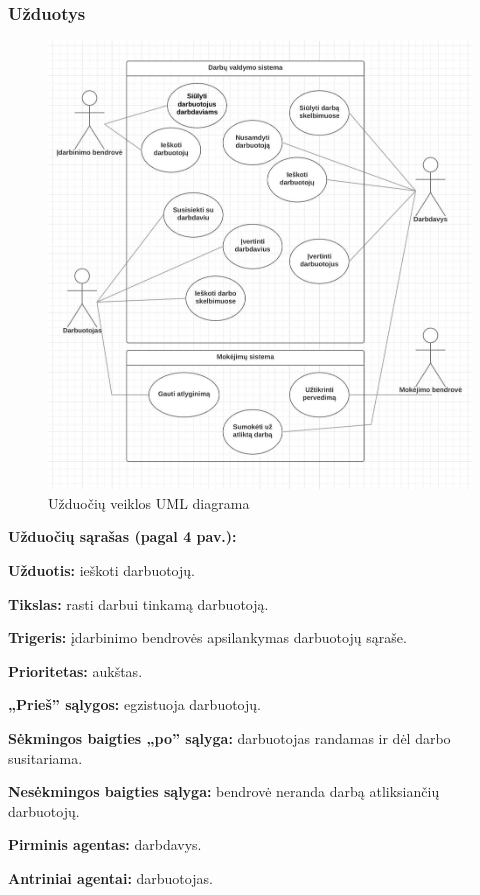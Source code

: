 \documentclass{VUMIFPSkursinis}
\begin{document}
\subsubsection{Užduotys}
\begin{figure}[H]
\centering
\includegraphics[width=\linewidth]{img/va2.png}
\caption{Užduočių veiklos UML diagrama}
\end{figure}

\textbf{Užduočių sąrašas (pagal 4 pav.):}

\textbf{Užduotis:} ieškoti darbuotojų.

\textbf{Tikslas:} rasti darbui tinkamą darbuotoją.

\textbf{Trigeris:} įdarbinimo bendrovės apsilankymas darbuotojų sąraše.

\textbf{Prioritetas:} aukštas.

\textbf{„Prieš” sąlygos:} egzistuoja darbuotojų.

\textbf{Sėkmingos baigties „po” sąlyga:} darbuotojas randamas ir dėl darbo susitariama.

\textbf{Nesėkmingos baigties sąlyga:} bendrovė neranda darbą atliksiančių darbuotojų.

\textbf{Pirminis agentas:} darbdavys.

\textbf{Antriniai agentai:} darbuotojas.
\\
\end{document}
